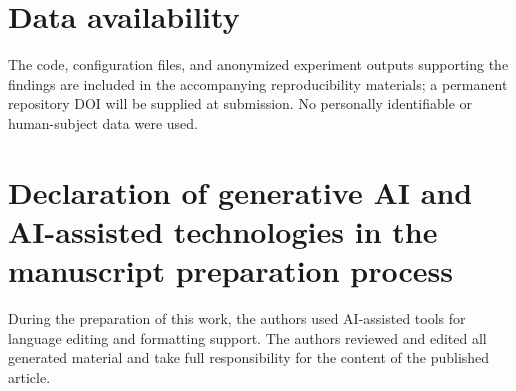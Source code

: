 \documentclass[preprint,12pt]{elsarticle}
\begin{document}
\section*{Data availability}
The code, configuration files, and anonymized experiment outputs supporting the findings are included in the accompanying reproducibility materials; a permanent repository DOI will be supplied at submission. No personally identifiable or human-subject data were used.

\section*{Declaration of generative AI and AI-assisted technologies in the manuscript preparation process}
During the preparation of this work, the authors used AI-assisted tools for language editing and formatting support. The authors reviewed and edited all generated material and take full responsibility for the content of the published article.



\end{document}
